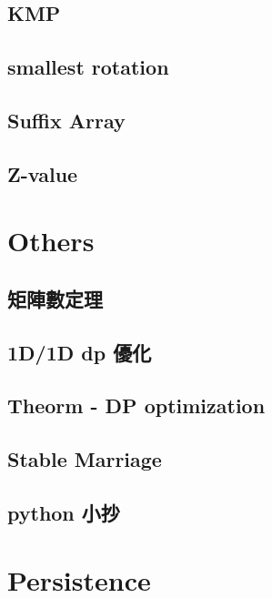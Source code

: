 \subsection{KMP}

\subsection{smallest rotation}

\subsection{Suffix Array}

\subsection{Z-value}


\section{Others}

\subsection{矩陣數定理}

\subsection{1D/1D dp 優化}

\subsection{Theorm - DP optimization}

\subsection{Stable Marriage}

\subsection{python 小抄}



\section{Persistence}

